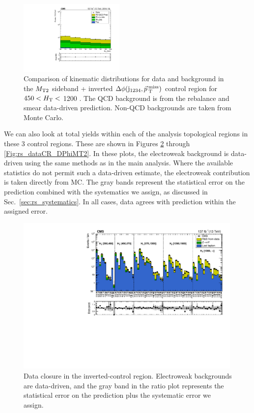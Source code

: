 \begin{figure}[!htbp]
\begin{center}
    \includegraphics[width=0.46\textwidth]{figs/qcd/rs_data/c_crRSDPhiMT2InclusiveHT450to1200_h_mt2.pdf}
    \caption{Comparison of kinematic distributions for data and background in the $M_{\mathrm{T2}}$ sideband + inverted $\Delta\phi(\mathrm{j}_{1234},\vec{p}_{\> \mathrm{T}}^{\> \mathrm{miss}})$ control region for $450<H_{\mathrm{T}}<$ 1200 \GeV. The QCD background is from the
             rebalance and smear data-driven prediction. Non-QCD backgrounds are taken from Monte Carlo.
            }
    \label{Fig:rs_crRSDPhiMT2InclusiveHT450to1200}
  \end{center}
\end{figure}

\newpage
We can also look at total yields within each of the analysis topological regions in these 3 control regions. 
These are shown in Figures \ref{Fig:rs_dataCR_InvertDPhi} through \ref{Fig:rs_dataCR_DPhiMT2}.
In these plots, the electroweak background is data-driven using the same methods as in the main analysis.
Where the available statistics do not permit such a data-driven estimate, the electroweak contribution is taken directly from MC.
The gray bands represent the statistical error on the prediction combined with the systematics we assign, as discussed in Sec.~\ref{sec:rs_systematics}.
In all cases, data agrees with prediction within the assigned error.

\begin{figure}[htbp]
  \begin{center}
    \includegraphics[width=0.99\textwidth]{figs/qcd/rs_data/comp_InvertDPhi.pdf}
    \caption{Data closure in the inverted-\dphimet control region. Electroweak backgrounds are data-driven, and the gray band in the ratio plot represents the statistical error on the prediction plus the systematic error we assign.}
    \label{Fig:rs_dataCR_InvertDPhi}
  \end{center}
\end{figure}

